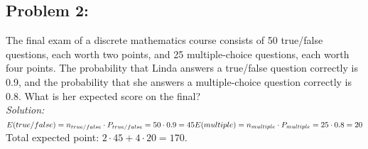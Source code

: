 \documentclass[a4paper]{article}
\begin{document}
	\subsection*{Problem 2:}
	The final exam of a discrete mathematics course consists of 50 true/false questions, each worth two points, and 25 multiple-choice questions, each worth four points. The probability that Linda answers a true/false question correctly is 0.9, and the probability that she answers a multiple-choice question correctly is 0.8. What is her expected score on the final? \\
	\textit{Solution:} \\
	\begin{math}
	E(true/false) = n_{true/false} \cdot P_{true/false} = 50 \cdot 0.9 = 45 \\
	E(multiple) = n_{multiple} \cdot P_{multiple} = 25 \cdot 0.8 = 20
	\end{math} \\
	Total expected point: $2\cdot45+4\cdot20=170$.
	
\end{document}
